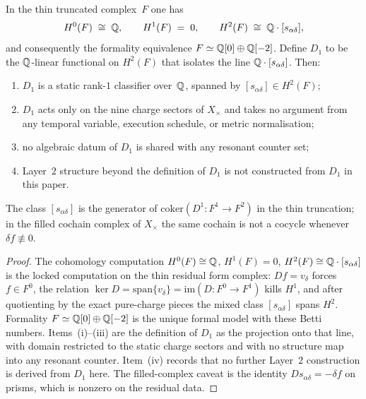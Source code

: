 \begin{theorem}\label{thm:D1}
In the thin truncated complex~$F$ one has
\[
H^0(F)\;\cong\;\mathbb{Q},\qquad
H^1(F)\;=\;0,\qquad
H^2(F)\;\cong\;\mathbb{Q}\cdot[s_{\alpha\delta}],
\]
and consequently the formality equivalence $F\simeq\mathbb{Q}[0]\oplus\mathbb{Q}[-2]$. Define $D_1$ to be the $\mathbb{Q}$-linear functional on $H^2(F)$ that isolates the line $\mathbb{Q}\cdot[s_{\alpha\delta}]$. Then:
\begin{enumerate}[label=(\roman*)]
\item $D_1$ is a static rank-$1$ classifier over~$\mathbb{Q}$, spanned by $[s_{\alpha\delta}]\in H^2(F)$;
\item $D_1$ acts only on the nine charge sectors of $X_\times$ and takes no argument from any temporal variable, execution schedule, or metric normalisation;
\item no algebraic datum of $D_1$ is shared with any resonant counter set;
\item Layer~$2$ structure beyond the definition of $D_1$ is not constructed from $D_1$ in this paper.
\end{enumerate}
The class $[s_{\alpha\delta}]$ is the generator of $\mathrm{coker}(D^1\colon F^1\to F^2)$ in the thin truncation; in the filled cochain complex of $X_\times$ the same cochain is not a cocycle whenever $\delta f\not\equiv0$.
\end{theorem}
\begin{proof}
The cohomology computation $H^0(F)\cong\mathbb{Q}$, $H^1(F)=0$, $H^2(F)\cong\mathbb{Q}\cdot[s_{\alpha\delta}]$ is the locked computation on the thin residual form complex: $Df=v_\delta$ forces $f\in F^0$, the relation $\ker D=\mathrm{span}\{v_\delta\}=\mathrm{im}(D\colon F^0\to F^1)$ kills $H^1$, and after quotienting by the exact pure-charge pieces the mixed class $[s_{\alpha\delta}]$ spans $H^2$. Formality $F\simeq\mathbb{Q}[0]\oplus\mathbb{Q}[-2]$ is the unique formal model with these Betti numbers. Items~(i)--(iii) are the definition of $D_1$ as the projection onto that line, with domain restricted to the static charge sectors and with no structure map into any resonant counter. Item~(iv) records that no further Layer~$2$ construction is derived from $D_1$ here. The filled-complex caveat is the identity $Ds_{\alpha\delta}=-\delta f$ on prisms, which is nonzero on the residual data.
\end{proof}

